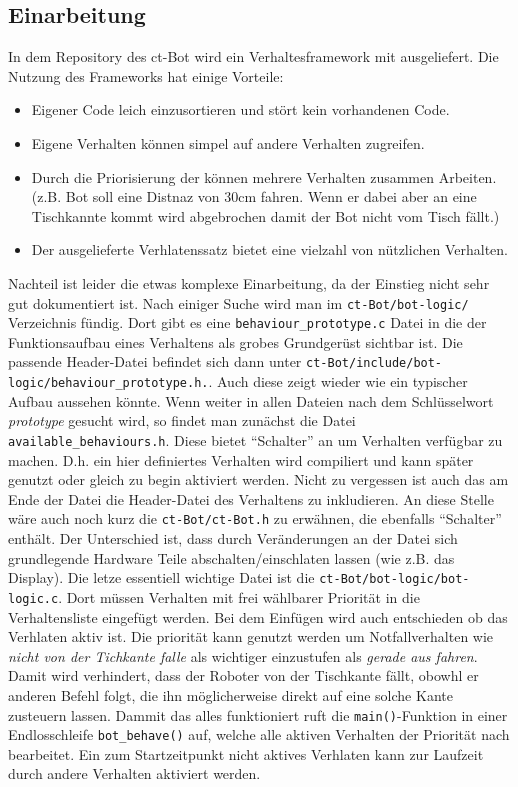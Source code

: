 \subsection{Einarbeitung}
\label{einarbeitung}
In dem Repository des ct-Bot wird ein Verhaltesframework mit ausgeliefert.
Die Nutzung des Frameworks hat einige Vorteile:
\begin{itemize}
	\item Eigener Code leich einzusortieren und stört kein vorhandenen Code.
	\item Eigene Verhalten können simpel auf andere Verhalten zugreifen.
	\item Durch die Priorisierung der können mehrere Verhalten zusammen Arbeiten.
		(z.B. Bot soll eine Distnaz von 30cm fahren. Wenn er dabei aber an eine
		Tischkannte kommt wird abgebrochen damit der Bot nicht vom Tisch fällt.)
	\item Der ausgelieferte Verhlatenssatz bietet eine vielzahl von nützlichen
		Verhalten.
\end{itemize}
Nachteil ist leider die etwas komplexe Einarbeitung, da der Einstieg nicht sehr gut
dokumentiert ist. Nach einiger Suche wird man im \verb+ct-Bot/bot-logic/+ 
Verzeichnis fündig. Dort gibt es eine \verb+behaviour_prototype.c+ Datei
in die der Funktionsaufbau eines Verhaltens als grobes Grundgerüst sichtbar ist.
Die passende Header-Datei befindet sich dann unter
\verb+ct-Bot/include/bot-logic/behaviour_prototype.h.+. Auch diese
zeigt wieder wie ein typischer Aufbau aussehen könnte. Wenn weiter in allen Dateien
nach dem Schlüsselwort \textit{prototype} gesucht wird, so findet man zunächst
die Datei \\ \verb+available_behaviours.h+. Diese bietet "`Schalter"'
an um Verhalten verfügbar zu machen. D.h. ein hier definiertes Verhalten
wird compiliert und kann später genutzt oder gleich zu begin aktiviert werden.
Nicht zu vergessen ist auch das am Ende der Datei die Header-Datei des
Verhaltens zu inkludieren. An diese Stelle wäre auch noch kurz die
\verb+ct-Bot/ct-Bot.h+ zu erwähnen, die ebenfalls "`Schalter"' enthält.
Der Unterschied ist, dass durch Veränderungen an der Datei sich grundlegende
Hardware Teile abschalten/einschlaten lassen (wie z.B. das Display).
Die letze essentiell wichtige Datei ist die \verb+ct-Bot/bot-logic/bot-logic.c+.
Dort müssen Verhalten mit frei wählbarer Priorität in die Verhaltensliste
eingefügt werden. Bei dem Einfügen wird auch entschieden ob das Verhlaten
aktiv ist. Die priorität kann genutzt werden um Notfallverhalten wie
\textit{nicht von der Tichkante falle} als wichtiger einzustufen als
\textit{gerade aus fahren}. Damit wird verhindert, dass der Roboter von der
Tischkante fällt, obowhl er anderen Befehl folgt, die ihn möglicherweise
direkt auf eine solche Kante zusteuern lassen. Dammit das alles funktioniert
ruft die \verb+main()+-Funktion in einer Endlosschleife \verb+bot_behave()+ auf,
welche alle aktiven Verhalten der Priorität nach bearbeitet. Ein zum
Startzeitpunkt nicht aktives Verhlaten kann zur Laufzeit durch andere Verhalten
aktiviert werden.

